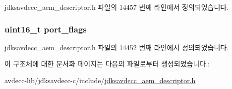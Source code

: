 jdksavdecc\+\_\+aem\+\_\+descriptor.\+h 파일의 14457 번째 라인에서 정의되었습니다.

\subsubsection[{\texorpdfstring{port\+\_\+flags}{port_flags}}]{\setlength{\rightskip}{0pt plus 5cm}uint16\+\_\+t port\+\_\+flags}\hypertarget{structjdksavdecc__descriptor__stream__port_a60a1f1704542df3b3f6e6db56622ddd9}{}\label{structjdksavdecc__descriptor__stream__port_a60a1f1704542df3b3f6e6db56622ddd9}


jdksavdecc\+\_\+aem\+\_\+descriptor.\+h 파일의 14452 번째 라인에서 정의되었습니다.



이 구조체에 대한 문서화 페이지는 다음의 파일로부터 생성되었습니다.\+:\begin{DoxyCompactItemize}
\item 
avdecc-\/lib/jdksavdecc-\/c/include/\hyperlink{jdksavdecc__aem__descriptor_8h}{jdksavdecc\+\_\+aem\+\_\+descriptor.\+h}\end{DoxyCompactItemize}
